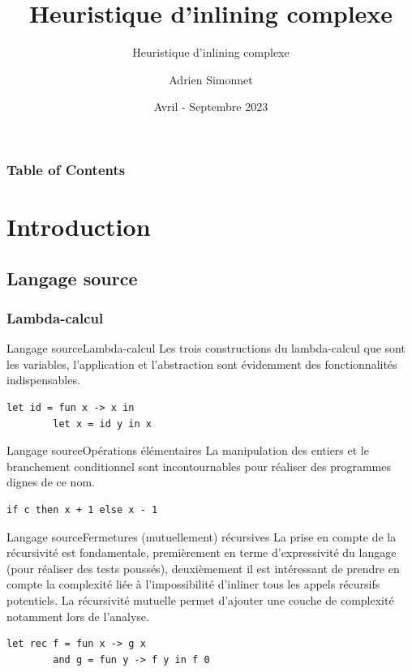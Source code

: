 \documentclass{beamer}
\title[Rapport de stage STL]{Heuristique d'inlining complexe}
\subtitle{Heuristique d'inlining complexe}
\author{Adrien Simonnet}
\institute{Sorbonne Université}
\date{Avril - Septembre 2023}
\begin{document}
\frame{\titlepage}

\begin{frame}
    \frametitle{Table of Contents}
    \tableofcontents
\end{frame}

\section{Introduction}

\subsection{Langage source}

\subsubsection{Lambda-calcul}

\begin{frame}[fragile]{Langage source}{Lambda-calcul}
    Les trois constructions du lambda-calcul que sont les variables, l'application et l'abstraction sont évidemment des fonctionnalités indispensables.
    \begin{lstlisting}[language=caml]
        let id = fun x -> x in
        let x = id y in x
    \end{lstlisting}
\end{frame}

\begin{frame}[fragile]{Langage source}{Opérations élémentaires}
    La manipulation des entiers et le branchement conditionnel sont incontournables pour réaliser des programmes dignes de ce nom.
    \begin{lstlisting}[language=caml]
        if c then x + 1 else x - 1
    \end{lstlisting}
\end{frame}

\begin{frame}[fragile]{Langage source}{Fermetures (mutuellement) récursives}
    La prise en compte de la récursivité est fondamentale, premièrement en terme d'expressivité du langage (pour réaliser des tests poussés), deuxièmement il est intéressant de prendre en compte la complexité liée à l'impossibilité d'inliner tous les appels récursifs potentiels. La récursivité mutuelle permet d'ajouter une couche de complexité notamment lors de l'analyse.
    \begin{lstlisting}[language=caml]
        let rec f = fun x -> g x
        and g = fun y -> f y in f 0
    \end{lstlisting}
\end{frame}
\end{document}
